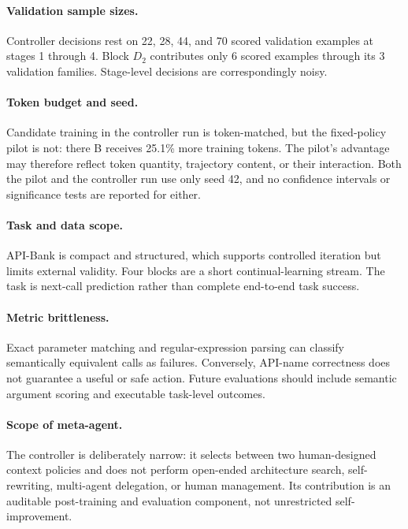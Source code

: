 \documentclass{article}
\begin{document}
\paragraph{Validation sample sizes.}
Controller decisions rest on 22, 28, 44, and 70 scored validation examples at stages 1 through 4. Block $D_2$ contributes only 6 scored examples through its 3 validation families. Stage-level decisions are correspondingly noisy.

\paragraph{Token budget and seed.}
Candidate training in the controller run is token-matched, but the fixed-policy pilot is not: there B receives 25.1\% more training tokens. The pilot's advantage may therefore reflect token quantity, trajectory content, or their interaction. Both the pilot and the controller run use only seed 42, and no confidence intervals or significance tests are reported for either.

\paragraph{Task and data scope.}
API-Bank is compact and structured, which supports controlled iteration but limits external validity. Four blocks are a short continual-learning stream. The task is next-call prediction rather than complete end-to-end task success.

\paragraph{Metric brittleness.}
Exact parameter matching and regular-expression parsing can classify semantically equivalent calls as failures. Conversely, API-name correctness does not guarantee a useful or safe action. Future evaluations should include semantic argument scoring and executable task-level outcomes.

\paragraph{Scope of meta-agent.}
The controller is deliberately narrow: it selects between two human-designed context policies and does not perform open-ended architecture search, self-rewriting, multi-agent delegation, or human management. Its contribution is an auditable post-training and evaluation component, not unrestricted self-improvement.
\end{document}
